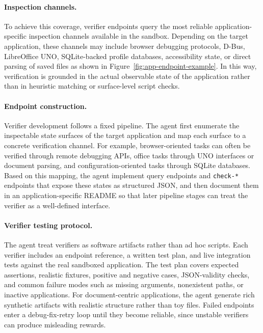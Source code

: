 \documentclass{llmxive}
\begin{document}
\paragraph{Inspection channels.} To achieve this coverage, verifier endpoints query the most reliable
application-specific inspection channels available in the sandbox. Depending on
the target application, these channels may include browser debugging protocols,
D-Bus, LibreOffice UNO, SQLite-backed profile databases, accessibility state,
or direct parsing of saved files as shown in Figure~\ref{fig:app-endpoint-example}. In this way, verification is grounded in the
actual observable state of the application rather than in heuristic matching or
surface-level script checks.

\paragraph{Endpoint construction.} Verifier development follows a fixed pipeline. The agent first enumerate the inspectable state surfaces of the target application and map each surface to a
concrete verification channel. For example, browser-oriented tasks can often be
verified through remote debugging APIs, office tasks through UNO interfaces or
document parsing, and configuration-oriented tasks through SQLite databases. Based on this mapping, the agent implement query endpoints and
\texttt{check-*} endpoints that expose these states as structured JSON, and then
document them in an application-specific README so that later pipeline stages
can treat the verifier as a well-defined interface.

\paragraph{Verifier testing protocol.} The agent treat verifiers as software artifacts rather than ad hoc scripts. Each verifier includes an endpoint reference, a written test plan, and live integration tests against the real sandboxed application. The test plan covers expected assertions, realistic fixtures, positive and negative cases, JSON-validity checks, and common failure modes such as missing arguments, nonexistent paths, or inactive applications. For document-centric applications, the agent generate rich synthetic artifacts with realistic structure rather than toy files. Failed endpoints enter a debug-fix-retry loop until they become reliable, since unstable verifiers can produce misleading rewards.
\end{document}
